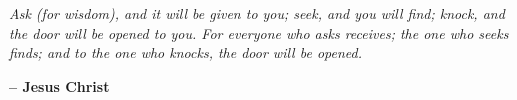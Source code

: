 \chapter*{}
\vspace*{\fill}

\begin{center}
\begin{minipage}{0.5\textwidth}
\itshape
    Ask (for wisdom), and it will be given to you; seek, and you will find; knock, and the door will be opened to you. For everyone who asks receives; the one who seeks finds; and to the one who knocks, the door will be opened.
\end{minipage}
\end{center}
\hspace*{0.75\textwidth} {\bfseries -- Jesus Christ}


\vspace*{\fill}
\newpage
